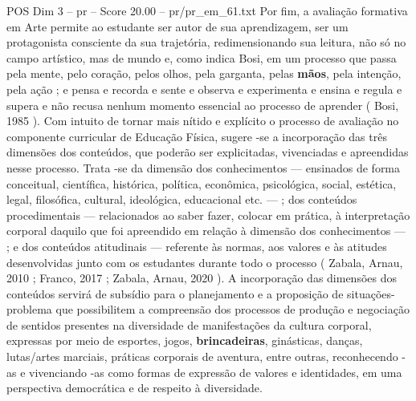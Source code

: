 \begin{textsample}{POS Dim 3 – pr – Score 20.00 – pr/pr\_em\_61.txt}  \label{ex:f3_pos_154}
Por fim, a avaliação formativa em Arte permite ao estudante ser autor de sua aprendizagem, ser um protagonista consciente da sua trajetória, redimensionando sua leitura, não só no campo artístico, mas de mundo e, como indica Bosi, em um processo que passa pela mente, pelo coração, pelos olhos, pela garganta, pelas \textbf{mãos}, pela intenção, pela ação ; e pensa e recorda e sente e observa e experimenta e ensina e regula e supera e não recusa nenhum momento essencial ao processo de aprender ( Bosi, 1985 ).
Com intuito de tornar mais nítido e explícito o processo de avaliação no componente curricular de Educação Física, sugere -se a incorporação das três dimensões dos conteúdos, que poderão ser explicitadas, vivenciadas e apreendidas nesse processo.
Trata -se da dimensão dos conhecimentos — ensinados de forma conceitual, científica, histórica, política, econômica, psicológica, social, estética, legal, filosófica, cultural, ideológica, educacional etc. — ; dos conteúdos procedimentais — relacionados ao saber fazer, colocar em prática, à interpretação corporal daquilo que foi apreendido em relação à dimensão dos conhecimentos — ; e dos conteúdos atitudinais — referente às normas, aos valores e às atitudes desenvolvidas junto com os estudantes durante todo o processo ( Zabala, Arnau, 2010 ; Franco, 2017 ; Zabala, Arnau, 2020 ).
A incorporação das dimensões dos conteúdos servirá de subsídio para o planejamento e a proposição de situações-problema que possibilitem a compreensão dos processos de produção e negociação de sentidos presentes na diversidade de manifestações da cultura corporal, expressas por meio de esportes, jogos, \textbf{brincadeiras}, ginásticas, danças, lutas/artes marciais, práticas corporais de aventura, entre outras, reconhecendo -as e vivenciando -as como formas de expressão de valores e identidades, em uma perspectiva democrática e de respeito à diversidade.

\end{textsample}
